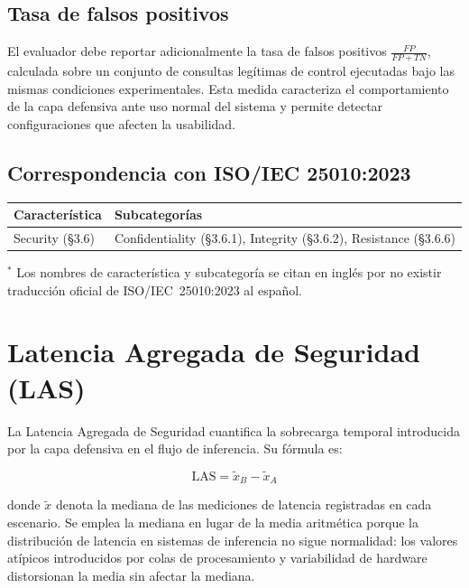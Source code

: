 \subsection{Tasa de falsos positivos}

El evaluador debe reportar adicionalmente la tasa de falsos positivos
$\frac{FP}{FP+TN}$, calculada sobre un conjunto de consultas legítimas
de control ejecutadas bajo las mismas condiciones experimentales. Esta
medida caracteriza el comportamiento de la capa defensiva ante uso
normal del sistema y permite detectar configuraciones que afecten la
usabilidad.

\subsection{Correspondencia con ISO/IEC 25010:2023}

\begin{table}[H]
    \centering
    \renewcommand{\arraystretch}{1.4}
    \begin{tabular}{
      >{\raggedright\arraybackslash}p{4cm}
      >{\raggedright\arraybackslash}p{7.5cm}
    }
    \toprule
    \textbf{Característica} & \textbf{Subcategorías} \\
    \midrule
    Security (\S3.6) &
      Confidentiality (\S3.6.1), Integrity (\S3.6.2),
      Resistance (\S3.6.6) \\
    \bottomrule
    \end{tabular}
    \vspace{0.3em}
    \begin{minipage}{11.5cm}
      \raggedright\small
      $^*$ Los nombres de característica y subcategoría se citan en inglés
      por no existir traducción oficial de ISO/IEC~25010:2023 al español.
    \end{minipage}
\end{table}
\section{Latencia Agregada de Seguridad (LAS)}
\label{sec:las}

La Latencia Agregada de Seguridad cuantifica la sobrecarga temporal
introducida por la capa defensiva en el flujo de inferencia. Su fórmula es:

\[
  \text{LAS} = \tilde{x}_B - \tilde{x}_A
\]

donde $\tilde{x}$ denota la mediana de las mediciones de latencia
registradas en cada escenario. Se emplea la mediana en lugar de la
media aritmética porque la distribución de latencia en sistemas de
inferencia no sigue normalidad: los valores atípicos introducidos por
colas de procesamiento y variabilidad de hardware distorsionan la
media sin afectar la mediana.

